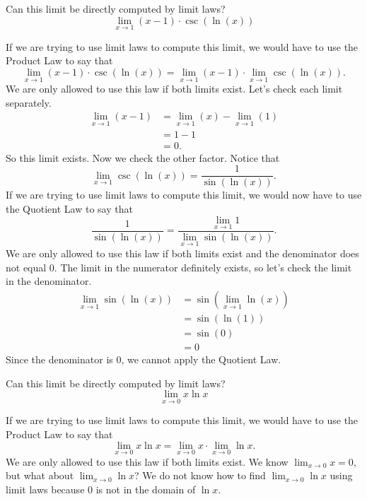 \documentclass{ximera}
\begin{document}
\begin{question}
  Can this limit be directly computed by limit laws?
  \[
  \lim_{x\to 1}{(x-1)\cdot \csc(\ln(x))}
  \]
  \begin{multipleChoice}
  \end{multipleChoice}
  \begin{feedback}
    If we are trying to use limit laws to compute this limit, we would have to use the Product Law to say that
    \[
    \lim_{x\to 1}{(x-1)\cdot \csc(\ln(x))}= \lim_{x\to 1}{(x-1)\cdot \lim_{x\to 1}\csc(\ln(x))}.
    \]
    We are only allowed to use this law if both limits exist.  Let's
    check each limit separately.
    \begin{align*}
      \lim_{x\to 1} (x-1) &= \lim_{x\to 1} (x)-\lim_{x\to 1}(1)\\
      &=1-1\\
      &=0.
    \end{align*}
   So this limit exists. Now we check the other factor.
   Notice that
   \[
   \lim_{x\to 1}\csc(\ln(x)) = \frac{1}{\sin(\ln(x))}.
   \]
   If we are trying to use limit laws to compute this limit, we would now have to use the Quotient Law to say that
   \[
   \frac{1}{\sin(\ln(x))} = \frac{\lim_{x\to 1}1}{\lim_{x\to
       1}\sin(\ln(x))}.
   \]
   We are only allowed to use this law if both limits exist and the
   denominator does not equal $0$.  The limit in the numerator definitely
   exists, so let's check the limit in the denominator.
   \begin{align*}
   \lim_{x\to 1}\sin(\ln(x)) &= \sin(\lim_{x\to 1}\ln(x))\\
   &=\sin(\ln(1))\\
   &= \sin(0)\\
   &= 0
  \end{align*}
  Since the denominator is $0$, we cannot apply the Quotient Law.
  \end{feedback}
\end{question}

\begin{question}
  Can this limit be directly computed by limit laws?
  \[
  \lim_{x\to 0} x\ln x
  \]
  \begin{multipleChoice}
  \end{multipleChoice}
  \begin{feedback}
  If we are trying to use limit laws to compute this limit, we would
  have to use the Product Law to say that
  \[
  \lim_{x\to 0} x\ln x =\lim_{x\to 0} x \cdot \lim_{x\to 0}\ln x.
  \]
  We are only allowed to use this law if both limits exist.  We know
  $\lim_{x\to 0} x = 0$, but what about $\lim_{x\to 0}\ln x$?  We do
  not know how to find $\lim_{x\to 0}\ln x$ using limit laws because $0$
  is not in the domain of $\ln x$.
  \end{feedback}
\end{question}
\end{document}
